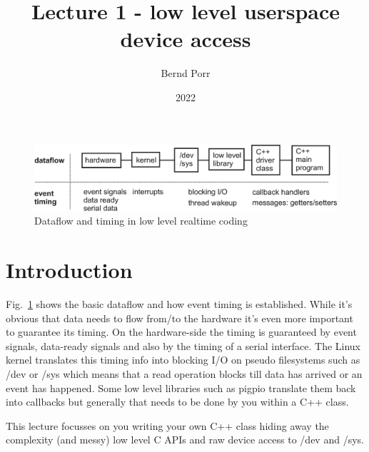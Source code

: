 \documentclass[12pt]{article}
\author{Bernd Porr}
\date{2022}
\title{Lecture 1 - low level userspace device access}
\begin{document}
\maketitle

\begin{figure}[!hbt]
\begin{center}
\mbox{\includegraphics[width=\textwidth]{timing}}
\end{center}
\caption{Dataflow and timing in low level realtime coding
\label{timing}}
\end{figure}

\section{Introduction}
Fig.~\ref{timing} shows the basic dataflow and how event timing
is established. While it's obvious that data needs to flow
from/to the hardware it's even more important to guarantee
its timing. On the hardware-side the timing is guaranteed
by event signals, data-ready signals and also by the timing
of a serial interface. The Linux kernel translates this
timing info into blocking I/O on pseudo filesystems such as /dev or /sys
which means that a read
operation blocks till data has arrived or an event has
happened. Some low level libraries such as pigpio
translate them back into callbacks but generally that
needs to be done by you within a C++ class.

This lecture focusses on you writing your own C++ class hiding away
the complexity (and messy) low level C APIs and raw device
access to /dev and /sys.
\end{document}
